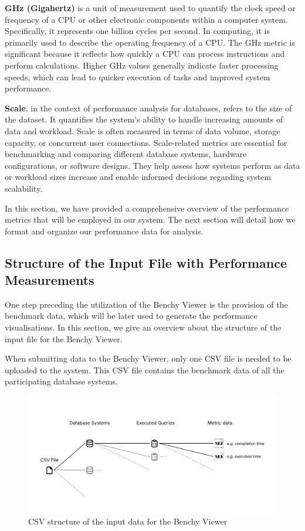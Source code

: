 \textbf{GHz (Gigahertz)} is a unit of measurement used to quantify the clock speed or frequency of a CPU or other electronic components within a computer system. Specifically, it represents one billion cycles per second. In computing, it is primarily used to describe the operating frequency of a CPU. The GHz metric is significant because it reflects how quickly a CPU can process instructions and perform calculations. Higher GHz values generally indicate faster processing speeds, which can lead to quicker execution of tasks and improved system performance.

\textbf{Scale}, in the context of performance analysis for databases, refers to the size of the dataset. It quantifies the system's ability to handle increasing amounts of data and workload. Scale is often measured in terms of data volume, storage capacity, or concurrent user connections. Scale-related metrics are essential for benchmarking and comparing different database systems, hardware configurations, or software designs. They help assess how systems perform as data or workload sizes increase and enable informed decisions regarding system scalability.

In this section, we have provided a comprehensive overview of the performance metrics that will be employed in our system. The next section will detail how we format and organize our performance data for analysis.



\subsection{Structure of the Input File with Performance Measurements}
One step preceding the utilization of the Benchy Viewer is the provision of the benchmark data, which will be later used to generate the performance visualisations. In this section, we give an overview about the structure of the input file for the Benchy Viewer.

When submitting data to the Benchy Viewer, only one CSV file is needed to be uploaded to the system. This CSV file contains the benchmark data of all the participating database systems.

\begin{figure}[h]
  \centering
  \includegraphics[width=1\linewidth]{figures/csv-structure.pdf}
  \caption{CSV structure of the input data for the Benchy Viewer}
  \label{fig:csv-structure}
\end{figure}


